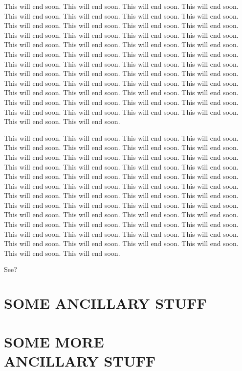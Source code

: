 \documentclass[10pt,econ,letterpaper]{authesis}
\def\ssp{\def\baselinestretch{1.0}\large\normalsize}
\begin{document}
This will end soon. This will end soon. This will end soon. This will end soon. This will end soon. This will end soon. This will end soon. This will end soon. This will end soon. This will end soon. This will end soon. This will end soon. This will end soon. This will end soon. This will end soon. This will end soon. This will end soon. This will end soon. This will end soon. This will end soon. This will end soon. This will end soon. This will end soon. This will end soon. This will end soon. This will end soon. This will end soon. This will end soon. This will end soon. This will end soon. This will end soon. This will end soon. This will end soon. This will end soon. This will end soon. This will end soon. This will end soon. This will end soon. This will end soon. This will end soon. This will end soon. This will end soon. This will end soon. This will end soon. This will end soon. This will end soon. This will end soon. This will end soon. This will end soon. This will end soon. 

This will end soon. This will end soon. This will end soon. This will end soon. This will end soon. This will end soon. This will end soon. This will end soon. This will end soon. This will end soon. This will end soon. This will end soon. This will end soon. This will end soon. This will end soon. This will end soon. This will end soon. This will end soon. This will end soon. This will end soon. This will end soon. This will end soon. This will end soon. This will end soon. This will end soon. This will end soon. This will end soon. This will end soon. This will end soon. This will end soon. This will end soon. This will end soon. This will end soon. This will end soon. This will end soon. This will end soon. This will end soon. This will end soon. This will end soon. This will end soon. This will end soon. This will end soon. This will end soon. This will end soon. This will end soon. This will end soon. This will end soon. This will end soon. This will end soon. This will end soon. 

See?

\appendix

\chapter{SOME ANCILLARY STUFF}


\chapter{SOME MORE\\ANCILLARY STUFF}



\ssp                           %
\nocite{*}
\end{document}
